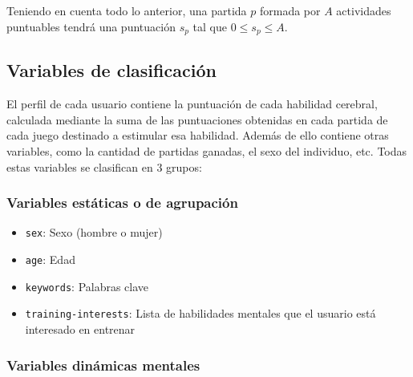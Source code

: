 Teniendo en cuenta todo lo anterior, una partida $p$ formada por $A$ actividades puntuables tendrá una puntuación $s_p$ tal que $0 \leq s_p \leq A$.

\subsection{Variables de clasificación}

El perfil de cada usuario contiene la puntuación de cada habilidad cerebral, calculada mediante la suma de las puntuaciones obtenidas en cada partida de cada juego destinado a estimular esa habilidad. Además de ello contiene otras variables, como la cantidad de partidas ganadas, el sexo del individuo, etc. Todas estas variables se clasifican en 3 grupos:

\subsubsection{Variables estáticas o de agrupación}

\begin{itemize}
\item {\tt sex}: Sexo (hombre o mujer)
\item {\tt age}: Edad
\item {\tt keywords}: Palabras clave
\item {\tt training-interests}: Lista de habilidades mentales que el usuario está interesado en entrenar
\end{itemize}

\subsubsection{Variables dinámicas mentales}

